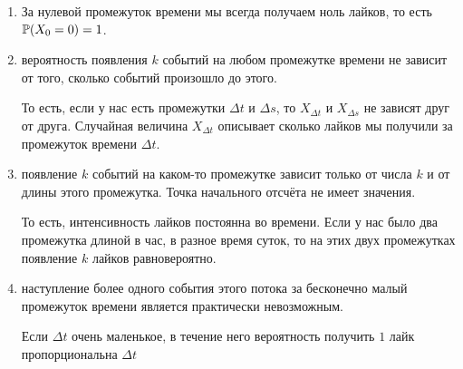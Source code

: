 \documentclass[12pt, a4paper, oneside]{article}
\begin{document}
\begin{enumerate} 
\item[\boxed{$PA-0$}] За нулевой промежуток времени мы всегда получаем ноль лайков, то есть $\mathbb{P}(X_0 = 0) = 1$.

\item[\boxed{$PA-1$}]  вероятность появления $k$ событий на любом промежутке времени не зависит от того, сколько событий произошло до этого. 

То есть, если у нас есть промежутки $\Delta t$ и $\Delta s$, то $X_{\Delta t}$ и  $X_{\Delta s}$ не зависят друг от друга. Случайная величина $X_{\Delta t}$ описывает сколько лайков мы получили за промежуток времени $\Delta t$. 

\begin{center} 
\end{center} 

\item[\boxed{$PA-2$}]  появление $k$ событий на каком-то промежутке зависит только от числа $k$ и от длины этого промежутка. Точка начального отсчёта не имеет значения. 

То есть, интенсивность лайков постоянна во времени. Если у нас было два промежутка длиной в час, в разное время суток, то на этих двух промежутках появление $k$ лайков равновероятно. 

\item[\boxed{$PA-3$}]  наступление более одного события этого потока за бесконечно малый промежуток времени является практически невозможным.

Если $\Delta t$ очень маленькое, в течение него вероятность получить $1$ лайк пропорциональна $\Delta t$


\end{enumerate}
\end{document}
